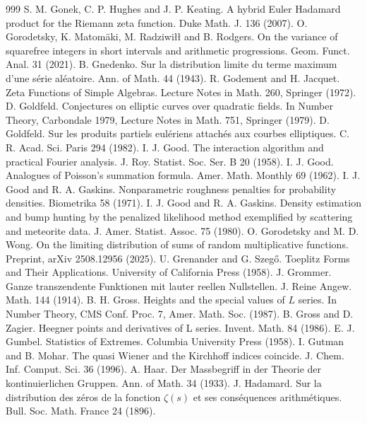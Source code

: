 \begin{thebibliography}{999}
 S. M. Gonek, C. P. Hughes and J. P. Keating. A hybrid Euler Hadamard product for the Riemann zeta function. Duke Math. J. 136 (2007).
 O. Gorodetsky, K. Matom\"aki, M. Radziwi\l\l{} and B. Rodgers. On the variance of squarefree integers in short intervals and arithmetic progressions. Geom. Funct. Anal. 31 (2021).
 B. Gnedenko. Sur la distribution limite du terme maximum d'une s\'erie al\'eatoire. Ann. of Math. 44 (1943).
 R. Godement and H. Jacquet. Zeta Functions of Simple Algebras. Lecture Notes in Math. 260, Springer (1972).
 D. Goldfeld. Conjectures on elliptic curves over quadratic fields. In Number Theory, Carbondale 1979, Lecture Notes in Math. 751, Springer (1979).
 D. Goldfeld. Sur les produits partiels eul\'eriens attach\'es aux courbes elliptiques. C. R. Acad. Sci. Paris 294 (1982).
 I. J. Good. The interaction algorithm and practical Fourier analysis. J. Roy. Statist. Soc. Ser. B 20 (1958).
 I. J. Good. Analogues of Poisson's summation formula. Amer. Math. Monthly 69 (1962).
 I. J. Good and R. A. Gaskins. Nonparametric roughness penalties for probability densities. Biometrika 58 (1971).
 I. J. Good and R. A. Gaskins. Density estimation and bump hunting by the penalized likelihood method exemplified by scattering and meteorite data. J. Amer. Statist. Assoc. 75 (1980).
 O. Gorodetsky and M. D. Wong. On the limiting distribution of sums of random multiplicative functions. Preprint, arXiv 2508.12956 (2025).
 U. Grenander and G. Szeg\H{o}. Toeplitz Forms and Their Applications. University of California Press (1958).
 J. Grommer. Ganze transzendente Funktionen mit lauter reellen Nullstellen. J. Reine Angew. Math. 144 (1914).
 B. H. Gross. Heights and the special values of $L$ series. In Number Theory, CMS Conf. Proc. 7, Amer. Math. Soc. (1987).
 B. Gross and D. Zagier. Heegner points and derivatives of L series. Invent. Math. 84 (1986).
 E. J. Gumbel. Statistics of Extremes. Columbia University Press (1958).
 I. Gutman and B. Mohar. The quasi Wiener and the Kirchhoff indices coincide. J. Chem. Inf. Comput. Sci. 36 (1996).
 A. Haar. Der Massbegriff in der Theorie der kontinuierlichen Gruppen. Ann. of Math. 34 (1933).
 J. Hadamard. Sur la distribution des z\'eros de la fonction $\zeta(s)$ et ses cons\'equences arithm\'etiques. Bull. Soc. Math. France 24 (1896).

\end{thebibliography}
